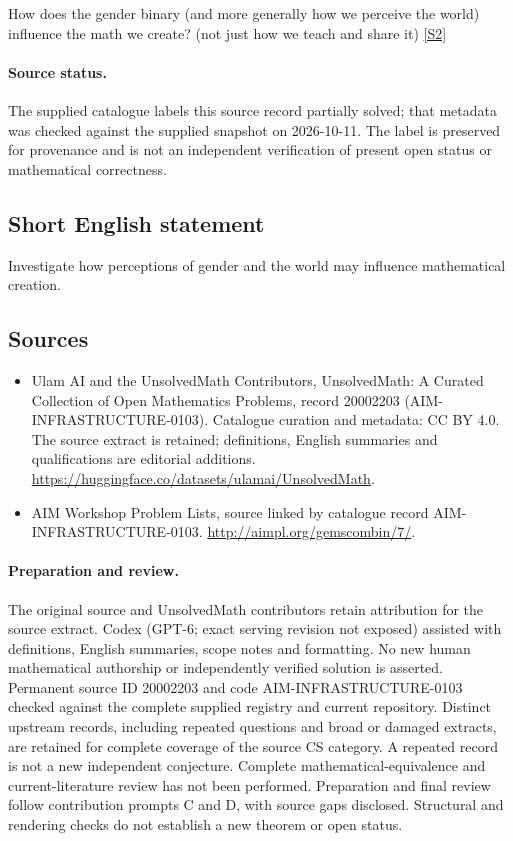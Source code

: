 \documentclass[11pt]{article}
\newcommand{\sref}[2]{\hyperlink{source:#1:#2}{[S#2]}}
\begin{document}
How does the gender binary (and more generally how we perceive the world) influence the math we create? (not just how we teach and share it) \sref{20002203}{2}
\paragraph{Source status.}
The supplied catalogue labels this source record partially solved; that metadata was checked against the supplied snapshot on 2026-10-11. The label is preserved for provenance and is not an independent verification of present open status or mathematical correctness.
\subsection{Short English statement}
Investigate how perceptions of gender and the world may influence mathematical creation.
\subsection{Sources}
\begin{itemize}
\item[\hypertarget{source:20002203:1}{S1}] Ulam AI and the UnsolvedMath Contributors, UnsolvedMath: A Curated Collection of Open Mathematics Problems, record 20002203 (AIM-INFRASTRUCTURE-0103). Catalogue curation and metadata: CC BY 4.0. The source extract is retained; definitions, English summaries and qualifications are editorial additions.
\url{https://huggingface.co/datasets/ulamai/UnsolvedMath}.
\item[\hypertarget{source:20002203:2}{S2}] AIM Workshop Problem Lists, source linked by catalogue record AIM-INFRASTRUCTURE-0103.
\url{http://aimpl.org/gemscombin/7/}.
\end{itemize}
\paragraph{Preparation and review.}
The original source and UnsolvedMath contributors retain attribution for the source extract. Codex (GPT-6; exact serving revision not exposed) assisted with definitions, English summaries, scope notes and formatting. No new human mathematical authorship or independently verified solution is asserted. Permanent source ID 20002203 and code AIM-INFRASTRUCTURE-0103 checked against the complete supplied registry and current repository. Distinct upstream records, including repeated questions and broad or damaged extracts, are retained for complete coverage of the source CS category. A repeated record is not a new independent conjecture. Complete mathematical-equivalence and current-literature review has not been performed. Preparation and final review follow contribution prompts C and D, with source gaps disclosed. Structural and rendering checks do not establish a new theorem or open status.
\label{end:20002203}
\end{document}
